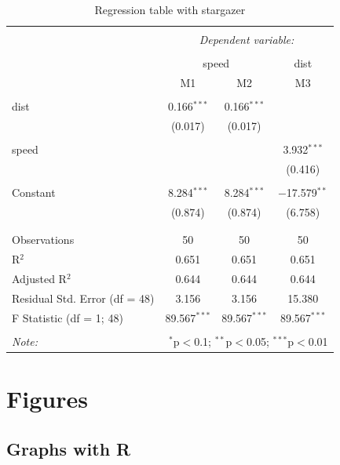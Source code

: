 \documentclass[
  12pt,
]{article}
\begin{document}
\begin{table}[H] \centering 
  \caption{Regression table with stargazer} 
  \label{tab2} 
\begin{tabular}{@{\extracolsep{5pt}}lccc} 
\\[-1.8ex]\hline 
\hline \\[-1.8ex] 
 & \multicolumn{3}{c}{\textit{Dependent variable:}} \\ 
\cline{2-4} 
\\[-1.8ex] & \multicolumn{2}{c}{speed} & dist \\ 
 & M1 & M2 & M3 \\ 
\hline \\[-1.8ex] 
 dist & 0.166$^{***}$ & 0.166$^{***}$ &  \\ 
  & (0.017) & (0.017) &  \\ 
  & & & \\ 
 speed &  &  & 3.932$^{***}$ \\ 
  &  &  & (0.416) \\ 
  & & & \\ 
 Constant & 8.284$^{***}$ & 8.284$^{***}$ & $-$17.579$^{**}$ \\ 
  & (0.874) & (0.874) & (6.758) \\ 
  & & & \\ 
\hline \\[-1.8ex] 
Observations & 50 & 50 & 50 \\ 
R$^{2}$ & 0.651 & 0.651 & 0.651 \\ 
Adjusted R$^{2}$ & 0.644 & 0.644 & 0.644 \\ 
Residual Std. Error (df = 48) & 3.156 & 3.156 & 15.380 \\ 
F Statistic (df = 1; 48) & 89.567$^{***}$ & 89.567$^{***}$ & 89.567$^{***}$ \\ 
\hline 
\hline \\[-1.8ex] 
\textit{Note:}  & \multicolumn{3}{r}{$^{*}$p$<$0.1; $^{**}$p$<$0.05; $^{***}$p$<$0.01} \\ 
\end{tabular} 
\end{table}

\hypertarget{figures}{%
\section{Figures}\label{figures}}

\hypertarget{graphs-with-r}{%
\subsection{Graphs with R}\label{graphs-with-r}}
\end{document}
